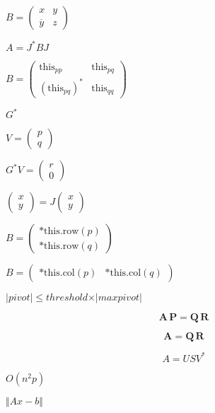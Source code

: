 \documentclass{article}
\begin{document}
$ B = \left ( \begin{array}{cc} x & y \\ \overline y & z \end{array} \right )$
\pagebreak

$ A = J^* B J $
\pagebreak

$ B = \left ( \begin{array}{cc} \text{this}_{pp} & \text{this}_{pq} \\ (\text{this}_{pq})^* & \text{this}_{qq} \end{array} \right )$
\pagebreak

$ G^* $
\pagebreak

$ V = \left ( \begin{array}{c} p \\ q \end{array} \right )$
\pagebreak

$ G^* V = \left ( \begin{array}{c} r \\ 0 \end{array} \right )$
\pagebreak

$ \left ( \begin{array}{cc} x \\ y \end{array} \right ) = J \left ( \begin{array}{cc} x \\ y \end{array} \right ) $
\pagebreak

$ B = \left ( \begin{array}{cc} \text{*this.row}(p) \\ \text{*this.row}(q) \end{array} \right ) $
\pagebreak

$ B = \left ( \begin{array}{cc} \text{*this.col}(p) & \text{*this.col}(q) \end{array} \right ) $
\pagebreak

$ \vert pivot \vert \leqslant threshold \times \vert maxpivot \vert $
\pagebreak

\[ \mathbf{A} \, \mathbf{P} = \mathbf{Q} \, \mathbf{R} \]
\pagebreak

\[ \mathbf{A} = \mathbf{Q} \, \mathbf{R} \]
\pagebreak

\[ A = U S V^* \]
\pagebreak

$ O(n^2p) $
\pagebreak

$ \Vert A x - b \Vert $
\pagebreak
\end{document}
